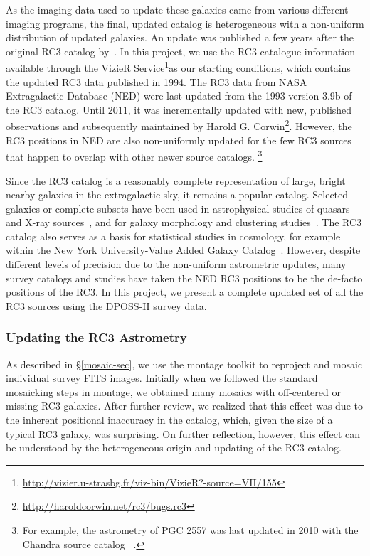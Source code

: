 \documentclass[authoryear, 12pt, 5p, times]{elsarticle}
\begin{document}
As the imaging data used to update these galaxies  came from various different imaging programs, the final, updated catalog is heterogeneous with a non-uniform distribution of updated galaxies. An update was published a few years after the original RC3 catalog by~\citet{rc3-94}. In this project, we use the RC3 catalogue information available through the VizieR Service\footnote{\url{http://vizier.u-strasbg.fr/viz-bin/VizieR?-source=VII/155}}as our starting conditions,  which contains the updated RC3 data published in 1994. The RC3 data from  NASA Extragalactic Database (NED) were last updated from the 1993 version 3.9b of the RC3 catalog. Until 2011, it was incrementally updated with new, published observations and subsequently maintained by Harold G. Corwin\footnote{\url{http://haroldcorwin.net/rc3/bugs.rc3}}. However, the RC3 positions in NED are also non-uniformly updated for the few RC3 sources that happen to overlap with other newer source catalogs. \footnote{For example, the astrometry of PGC 2557 was last updated in 2010 with the Chandra source catalog ~\citep{chandra}.} 

Since the RC3 catalog  is a reasonably complete representation of large, bright nearby galaxies in the extragalactic sky, it remains a popular catalog. Selected galaxies or complete subsets have been used in astrophysical studies of quasars and X-ray sources~\citep[e.g.,][]{walton-rc3}, and for galaxy morphology and clustering studies~\citep[e.g.,][]{best-rc3, knapen-rc3}.  The RC3 catalog also serves as a basis for statistical studies  in cosmology, for example within the New York University-Value Added Galaxy Catalog~\citep{nyuvagc}. However, despite different levels of precision due to the non-uniform astrometric updates, many survey catalogs and studies have taken the NED RC3 positions to be the de-facto positions of the RC3. In this project, we present a complete updated set of all the RC3 sources using the  DPOSS-II survey data. 

\subsubsection{Updating the RC3 Astrometry\label{sec:position}}

As described in \S\ref{mosaic-sec}, we use the montage toolkit to reproject and mosaic individual survey FITS images. Initially when we followed the standard mosaicking steps in montage, we obtained many mosaics with off-centered or missing RC3 galaxies. After further review, we realized that this effect was due to the inherent positional inaccuracy in the catalog, which, given the size of a typical RC3 galaxy, was surprising. On further reflection, however, this effect can be understood by the heterogeneous origin and updating of the RC3 catalog.
\end{document}

